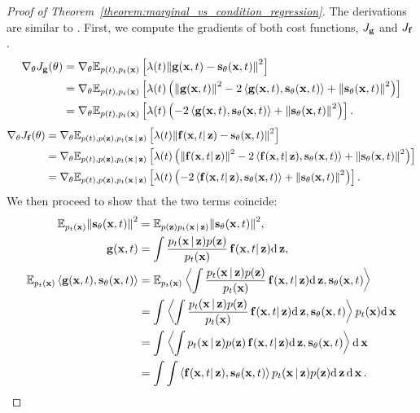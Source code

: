 \begin{proof}[Proof of Theorem~\ref{theorem:marginal_vs_condition_regression}]

The derivations are similar to \citet{lipman2023conditionalflowmatching,tong2024conditionalflowmatching}. First, we compute the gradients of both cost functions, $J_{\bg}$ and $J_{\bbf}$.
\begin{align}
\nabla_{\btheta}J_{\bg}(\btheta) &= \nabla_{\btheta}\E_{p(t),p_{t}(\bx)}\left[\lambda(t)\norm{\bg(\bx,t) - \bs_{\btheta}(\bx,t)}^2\right]\\
&= \nabla_{\btheta}\E_{p(t),p_{t}(\bx)}\left[\lambda(t)\left(\norm{\bg(\bx,t)}^{2} - 2 \left\langle\bg(\bx,t),\bs_{\btheta}(\bx,t)\right\rangle + \norm{\bs_{\btheta}(\bx,t)}^{2}\right)\right]\\
&= \nabla_{\btheta}\E_{p(t),p_{t}(\bx)}\left[\lambda(t)\left( - 2 \left\langle\bg(\bx,t),\bs_{\btheta}(\bx,t)\right\rangle + \norm{\bs_{\btheta}(\bx,t)}^{2}\right)\right].
\end{align}
\begin{align}
\nabla_{\btheta}J_{\bbf}(\btheta) &= \nabla_{\btheta}\E_{p(t),p(\bz),p_{t}(\bx|\bz)}\left[\lambda(t)\norm{\bbf(\bx,t|\bz) - \bs_{\btheta}(\bx,t)}^2\right]\\
&= \nabla_{\btheta}\E_{p(t),p(\bz),p_{t}(\bx|\bz)}\left[\lambda(t)\left(\norm{\bbf(\bx,t|\bz)}^{2} - 2 \left\langle\bbf(\bx,t|\bz), \bs_{\btheta}(\bx,t)\right\rangle + \norm{\bs_{\btheta}(\bx,t)}^{2}\right)\right]\\
&= \nabla_{\btheta}\E_{p(t),p(\bz),p_{t}(\bx|\bz)}\left[\lambda(t)\left(- 2 \left\langle\bbf(\bx,t|\bz),\bs_{\btheta}(\bx,t)\right\rangle + \norm{\bs_{\btheta}(\bx,t)}^{2}\right)\right].
\end{align}
We then proceed to show that the two terms coincide:
\begin{align}
\E_{p_{t}(\bx)} \norm{\bs_{\btheta}(\bx,t)}^{2} &= \E_{p(\bz)p_{t}(\bx|\bz)} \norm{\bs_{\btheta}(\bx,t)}^{2},\\
\bg(\bx,t) &= \int \frac{p_{t}(\bx|\bz)p(\bz)}{p_{t}(\bx)} \bbf(\bx,t|\bz)\dd\bz,\\
\E_{p_{t}(\bx)}\left\langle \bg(\bx,t), \bs_{\btheta}(\bx,t) \right\rangle &= \E_{p_{t}(\bx)} \left\langle \int \frac{p_{t}(\bx|\bz)p(\bz)}{p_{t}(\bx)} \bbf(\bx,t|\bz)\dd\bz,\bs_{\btheta}(\bx,t) \right\rangle\\
&= \int \left\langle \int \frac{p_{t}(\bx|\bz)p(\bz)}{p_{t}(\bx)} \bbf(\bx,t|\bz)\dd\bz,\bs_{\btheta}(\bx,t) \right\rangle p_{t}(\bx) \dd\bx\\
&= \int \left\langle \int p_{t}(\bx|\bz)p(\bz) \bbf(\bx,t|\bz)\dd\bz,\bs_{\btheta}(\bx,t) \right\rangle \dd\bx\\
&= \int\int \left\langle\bbf(\bx,t|\bz),\bs_{\btheta}(\bx,t) \right\rangle p_{t}(\bx|\bz)p(\bz) \dd\bz \dd\bx.
\end{align}
\end{proof}

